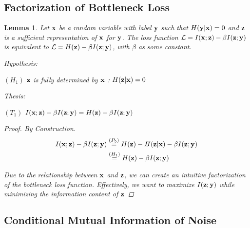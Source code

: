 \documentclass[letterpaper]{article} %
\theoremstyle{plain}
\newtheorem{lemma}[theorem]{Lemma}
\theoremstyle{definition}
\theoremstyle{remark}
\begin{document}
\subsection{Factorization of Bottleneck Loss}

\begin{lemma}
    Let ${\mathbf{x}}$ be a random variable with label ${\mathbf{y}}$ such that $H({\mathbf{y}}| {\mathbf{x}}) = 0$ and ${\mathbf{z}}$ is a sufficient representation of ${\mathbf{x}}$ for ${\mathbf{y}}$. The loss function 
    $\mathcal{L}=I({\mathbf{x}}; {\mathbf{z}})-\beta I({\mathbf{z}}; {\mathbf{y}})$ is equivalent to $\mathcal{L}=H({\mathbf{z}})-\beta I({\mathbf{z}}; {\mathbf{y}})$, with $\beta$ as some constant. 

    Hypothesis: 
    
    $(H_1)$  ${\mathbf{z}}$ is fully determined by ${\mathbf{x}}$ : $H({\mathbf{z}}|{\mathbf{x}}) = 0$

    Thesis: 

    $(T_1)$ $ I({\mathbf{x}}; {\mathbf{z}})-\beta I({\mathbf{z}}; {\mathbf{y}}) = H({\mathbf{z}})-\beta I({\mathbf{z}}; {\mathbf{y}})$

    \begin{proof} By Construction. 
    $$
        \begin{aligned}
        I({\mathbf{x}}; {\mathbf{z}})-\beta I({\mathbf{z}}; {\mathbf{y}}) &\stackrel{\left(P_5\right)}{=} H({\mathbf{z}}) - H({\mathbf{z}}| {\mathbf{x}}) -\beta I({\mathbf{z}};{\mathbf{y}}) \\
        &\stackrel{\left(H_1\right)}{=} H({\mathbf{z}}) -\beta I({\mathbf{z}}; {\mathbf{y}})
        \end{aligned}
    $$

    Due to the relationship between ${\mathbf{x}}$ and ${\mathbf{z}}$, we can create an intuitive factorization of the bottleneck loss function. Effectively, we want to maximize $I({\mathbf{z}}; {\mathbf{y}})$ while minimizing the information content of ${\mathbf{z}}$

    \end{proof}

    \label{lossfact}
\end{lemma}

\subsection{Conditional Mutual Information of Noise}
\end{document}

